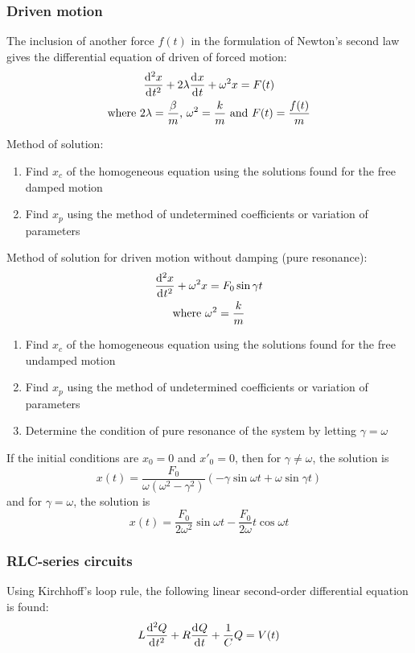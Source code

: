 \documentclass[10pt, twocolumn]{article}
\theoremstyle{definition}
\begin{document}
\subsubsection*{Driven motion}
The inclusion of another force \(f(t)\) in the formulation of Newton's second law gives the differential equation of driven of forced motion:
\begin{gather*}
  \frac{\mathrm{d}^{2} x}{\mathrm{d}^{} t^{2}} + 2\lambda\frac{\mathrm{d}^{} x}{\mathrm{d}^{} t} + \omega^2 x = F(t) \\
  \text{where } 2\lambda = \frac{\beta}{m} \text{, } \omega^2 = \frac{k}{m} \text{ and } F(t) = \frac{f(t)}{m}
\end{gather*}

Method of solution:
\begin{enumerate}
  \item Find \(x_c \) of the homogeneous equation using the solutions found for the free damped motion
  \item Find \(x_p \) using the method of undetermined coefficients or variation of parameters
\end{enumerate}

Method of solution for driven motion without damping (pure resonance):
\begin{gather*}
  \frac{\mathrm{d}^{2} x}{\mathrm{d}^{} t^{2}} + \omega^2 x = F_0 \sin{\gamma t} \\
  \text{where } \omega^2 = \frac{k}{m}
\end{gather*}
\begin{enumerate}
  \item Find \(x_c \) of the homogeneous equation using the solutions found for the free undamped motion
  \item Find \(x_p \) using the method of undetermined coefficients or variation of parameters
  \item Determine the condition of pure resonance of the system by letting \(\gamma = \omega\)
\end{enumerate}

If the initial conditions are \(x_0 = 0\) and \(x'_0 = 0\), then for \(\gamma \neq \omega\), the solution is
\[
  x(t) = \frac{F_0 }{\omega\left( \omega^2 - \gamma^2 \right)}(- \gamma\sin{\omega t} + \omega\sin{\gamma t})
\]
and for \(\gamma = \omega\), the solution is
\[
  x(t) = \frac{F_0 }{2\omega^2 }\sin{\omega t} - \frac{F_0 }{2\omega}t\cos{\omega t}
\]


\subsubsection*{RLC-series circuits}
Using Kirchhoff's loop rule, the following linear second-order differential equation is found:
\[
  L\frac{\mathrm{d}^{2} Q}{\mathrm{d}^{} t^{2}} + R\frac{\mathrm{d}^{} Q}{\mathrm{d}^{} t} + \frac{1}{C}Q = V(t)
\]
\end{document}
